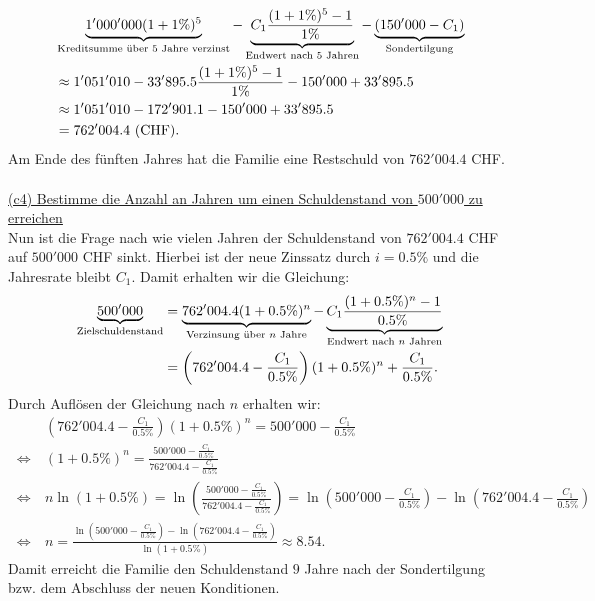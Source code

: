 \begin{align*}
	&\underbrace{1'000'000(1+1 \%)^{5}}_{\textrm{Kreditsumme über } 5 \textrm{ Jahre verzinst}}
	-
	\underbrace{C_1 \frac{(1+ 1 \%)^{5}  - 1}{1 \%}}_{
	\textrm{Endwert nach $ 5 $ Jahren}
	}
	-
	\underbrace{(150'000 - C_1)}_{\textrm{Sondertilgung}}\\
	&\approx 1'051'010
	- 33'895.5 \frac{(1+ 1\%)^5 - 1}{1 \%} -150'000 + 33'895.5\\
	&\approx
	1'051'010
	-
	172'901.1
	-150'000 + 33'895.5\\
	&= 
	762'004.4 \ \textrm{(CHF)}.
\end{align*}
Am Ende des fünften Jahres hat die Familie eine Restschuld von $ 762'004.4 $ CHF.\\
\\
\newpage
\underline{(c4) Bestimme die Anzahl an Jahren um einen Schuldenstand von $ 500'000$ zu erreichen}\\
Nun ist die Frage nach wie vielen Jahren der Schuldenstand von $ 762'004.4 $ CHF auf 
$ 500'000 $ CHF sinkt.
Hierbei ist der neue Zinssatz durch $ i = 0.5 \% $ und die Jahresrate bleibt $ C_1 $.
Damit erhalten wir die Gleichung:
\begin{align*}
	\underbrace{500'000}_{\textrm{Zielschuldenstand}}
	&=
	\underbrace{762'004.4 (1+ 0.5 \%)^n}_{\textrm{Verzinsung über $ n $ Jahre}}
	-
	\underbrace{C_1 \frac{(1+ 0.5 \%)^{n}  - 1}{0.5 \%}}_{\textrm{Endwert nach $ n $ Jahren}}\\
	&=
	\left(762'004.4 - \frac{C_1}{0.5 \%} \right)(1+ 0.5 \%)^{n} + \frac{C_1}{0.5 \%}.
\end{align*}
Durch Auflösen der Gleichung nach $ n $ erhalten wir:
\begin{align*}
	&\left(762'004.4 - \frac{C_1}{0.5 \%} \right)(1+ 0.5 \%)^{n} = 500'000 -  \frac{C_1}{0.5 \%}\\
	\ \Leftrightarrow \
	&(1 + 0.5 \%)^n
	=
	\frac{500'000 -  \frac{C_1}{0.5 \%}}{762'004.4 - \frac{C_1}{0.5 \%}}\\
	\ \Leftrightarrow \
	&n  \ln(1 + 0.5 \%)
	=
	\ln\left(
	\frac{500'000 -  \frac{C_1}{0.5 \%}}{762'004.4 - \frac{C_1}{0.5 \%}}
	\right)
	= 
	\ln\left(500'000 -  \frac{C_1}{0.5 \%} \right)
	- 
	\ln\left(762'004.4 - \frac{C_1}{0.5 \%} \right)\\
	\ \Leftrightarrow \
	&n = 
	\frac{\ln\left(500'000 -  \frac{C_1}{0.5 \%} \right)
		- 
		\ln\left(762'004.4 - \frac{C_1}{0.5 \%} \right)}{\ln(1 + 0.5 \%)} \approx 8.54.
\end{align*}
Damit erreicht die Familie den Schuldenstand $ 9  $ Jahre nach der Sondertilgung bzw. dem Abschluss der neuen Konditionen.
